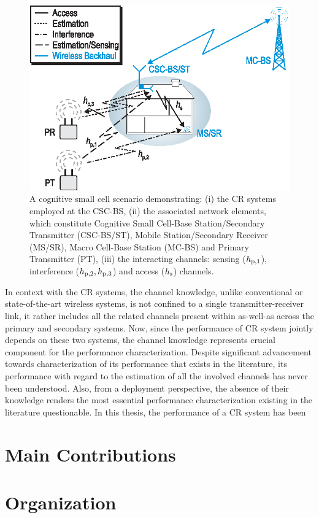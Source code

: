 \begin{figure}[!t]
\centering
\includegraphics[width = \figscalet]{figures/CR_Scenario_Hybrid}
\caption{A cognitive small cell scenario demonstrating: (i) the CR systems employed at the CSC-BS, (ii) the associated network elements, which constitute Cognitive Small Cell-Base Station/Secondary Transmitter (CSC-BS/ST), Mobile Station/Secondary Receiver (MS/SR), Macro Cell-Base Station (MC-BS) and Primary Transmitter (PT), (iii) the interacting channels: sensing ($h_{\text{p,1}}$), interference ($h_{\text{p,2}}, h_{\text{p,3}}$) and access ($h_{\text{s}}$) channels.}
\label{fig:scenario}
\end{figure}


In context with the CR systems, the channel knowledge, unlike conventional or state-of-the-art wireless systems, is not confined to a single transmitter-receiver link, it rather includes all the related channels present within as-well-as across the primary and secondary systems. Now, since the performance of CR system jointly depends on these two systems, the channel knowledge represents crucial component for the performance characterization. Despite significant advancement towards characterization of its performance that exists in the literature, its performance with regard to the estimation of all the involved channels has never been understood. Also, from a deployment perspective, the absence of their knowledge renders the most essential performance characterization existing in the literature questionable. In this thesis, the performance of a CR system has been   


\section{Main Contributions}

\section{Organization}
